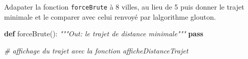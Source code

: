 \documentclass[
  paper=a4,
  ,captions=tableheading
]{scrartcl}
\newenvironment{Shaded}{}{}
\newcommand{\CommentTok}[1]{\textcolor[rgb]{0.38,0.63,0.69}{\textit{#1}}}
\newcommand{\ControlFlowTok}[1]{\textcolor[rgb]{0.00,0.44,0.13}{\textbf{#1}}}
\newcommand{\KeywordTok}[1]{\textcolor[rgb]{0.00,0.44,0.13}{\textbf{#1}}}
\newcommand{\NormalTok}[1]{#1}
\begin{document}
Adapater la fonction \texttt{forceBrute} à 8 villes, au lieu de 5 puis
donner le trajet minimale et le comparer avec celui renvoyé par
l\textquotesingle algorithme glouton.

\begin{Shaded}
\begin{Highlighting}[]
\KeywordTok{def}\NormalTok{ forceBrute():}
    \CommentTok{"""Out: le trajet de distance minimale"""}
    \ControlFlowTok{pass}
\end{Highlighting}
\end{Shaded}

\begin{Shaded}
\begin{Highlighting}[]
\CommentTok{\# affichage du trajet avec la fonction afficheDistanceTrajet}
\end{Highlighting}
\end{Shaded}

\begin{Shaded}
\begin{Highlighting}[]

\end{Highlighting}
\end{Shaded}
\end{document}
